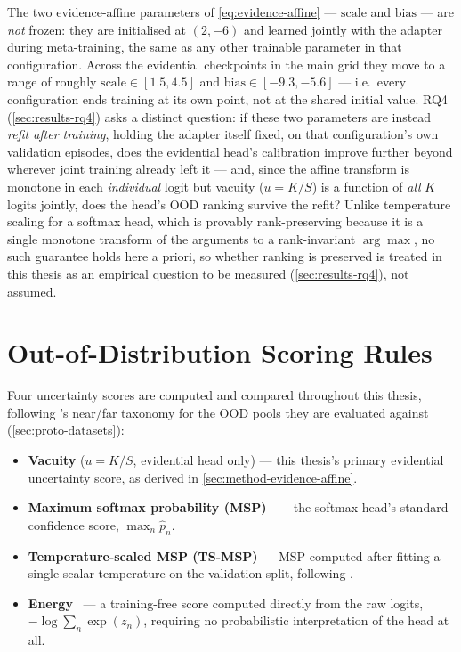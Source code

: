 \documentclass{iutbscthesis}
\begin{document}
The two evidence-affine parameters of \autoref{eq:evidence-affine} — $\mathrm{scale}$ and $\mathrm{bias}$ — are \emph{not} frozen: they are initialised at $(2, -6)$ and learned jointly with the adapter during meta-training, the same as any other trainable parameter in that configuration. Across the evidential checkpoints in the main grid they move to a range of roughly $\mathrm{scale} \in [1.5, 4.5]$ and $\mathrm{bias} \in [-9.3, -5.6]$ — i.e.\ every configuration ends training at its own point, not at the shared initial value. RQ4 (\autoref{sec:results-rq4}) asks a distinct question: if these two parameters are instead \emph{refit after training}, holding the adapter itself fixed, on that configuration's own validation episodes, does the evidential head's calibration improve further beyond wherever joint training already left it — and, since the affine transform is monotone in each \emph{individual} logit but vacuity ($u = K/S$) is a function of \emph{all} $K$ logits jointly, does the head's OOD ranking survive the refit? Unlike temperature scaling for a softmax head, which is provably rank-preserving because it is a single monotone transform of the arguments to a rank-invariant $\arg\max$, no such guarantee holds here a priori, so whether ranking is preserved is treated in this thesis as an empirical question to be measured (\autoref{sec:results-rq4}), not assumed.

\section{Out-of-Distribution Scoring Rules}
\label{sec:method-ood-scores}

Four uncertainty scores are computed and compared throughout this thesis, following \textcite{yang2022openood}'s near/far taxonomy for the OOD pools they are evaluated against (\autoref{sec:proto-datasets}):

\begin{itemize}
    \item \textbf{Vacuity} ($u = K/S$, evidential head only) — this thesis's primary evidential uncertainty score, as derived in \autoref{sec:method-evidence-affine}.
    \item \textbf{Maximum softmax probability (MSP)}~\cite{hendrycks2017baseline} — the softmax head's standard confidence score, $\max_n \hat p_n$.
    \item \textbf{Temperature-scaled MSP (TS-MSP)} — MSP computed after fitting a single scalar temperature on the validation split, following \textcite{guo2017calibration}.
    \item \textbf{Energy}~\cite{liu2020energy} — a training-free score computed directly from the raw logits, $-\log \sum_n \exp(z_n)$, requiring no probabilistic interpretation of the head at all.
\end{itemize}
\end{document}
